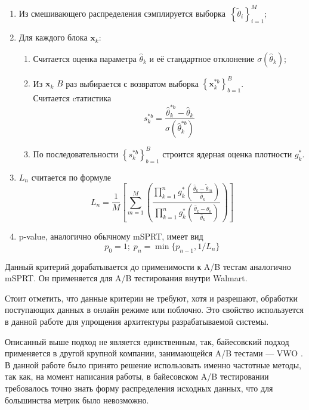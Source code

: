 \documentclass[../document.tex]{subfiles}
\begin{document}
	\begin{enumerate}
		\item Из смешивающего распределения сэмплируется выборка~$\left\{\tilde{\theta}_i\right\}_{i=1}^{M}$;
		\item Для каждого блока $\textbf{x}_k$:
		\begin{enumerate}
			\item Считается оценка параметра $\hat{\theta}_k$ и её стандартное отклонение $\sigma(\hat{\theta}_k)$;
			\item Из $\textbf{x}_k$ $B$ раз выбирается с возвратом выборка $\left\{\textbf{x}_k^{*b}\right\}_{b=1}^{B}$.\\Считается cтатистика
			\begin{equation}
				s_k^{*b}=\frac{\hat{\theta}_k^{*b} - \hat{\theta}_k}{\sigma(\hat{\theta}_k^{*b})}
			\end{equation}
			\item По последовательности $\left\{s_k^{*b}\right\}_{b=1}^{B}$ строится ядерная оценка плотности $g^{*}_k$.
		\end{enumerate}
		\item $L_n$ считается по формуле
		\begin{equation}
			L_n = \frac{1}{M}\left[
				\sum\limits_{m=1}^{M}\left(
					\frac{
						\prod_{k=1}^{n} g^{*}_k\left(\frac{\hat{\theta}_k - \tilde{\theta}_m}{\hat{\theta}_k}\right)
					}{
						\prod_{k=1}^{n} g^{*}_k\left(\frac{\hat{\theta}_k - \theta_0}{\hat{\theta}_k}\right)
					}
				\right)
			\right]
		\end{equation}
		\item p-value, аналогично обычному mSPRT, имеет вид
		\begin{equation}
			p_0=1;\;p_n=\min\{p_{n-1},1/L_n\}
		\end{equation}
	\end{enumerate}
	\par Данный критерий дорабатывается до применимости к A/B тестам аналогично mSPRT. Он применяется для A/B тестирования внутри Walmart.
	\par Стоит отметить, что данные критерии не требуют, хотя и разрешают, обработки поступающих данных в онлайн режиме или поблочно. Это свойство используется в данной работе для упрощения архитектуры разрабатываемой системы.
	\par Описанный выше подход не является единственным, так, байесовский подход \cite{stucchio_bayesian} применяется в другой крупной компании, занимающейся A/B тестами --- VWO \cite{vwo}. В данной работе было принято решение использовать именно частотные методы, так как, на момент написания работы, в байесовском A/B тестировании требовалось точно знать форму распределения исходных данных, что для большинства метрик было невозможно.
\end{document}
